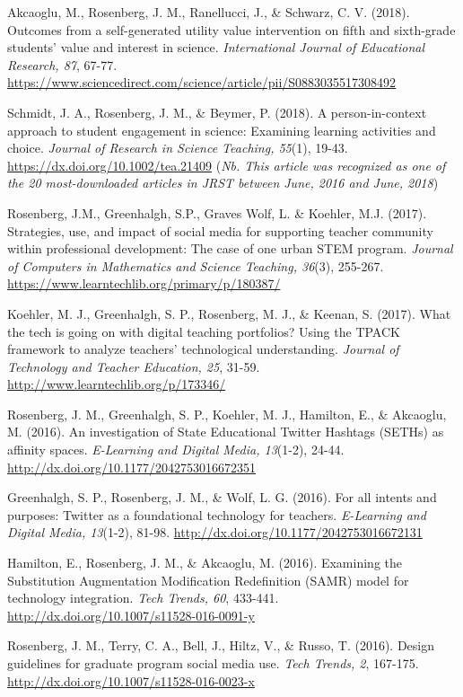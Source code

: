 \documentclass[14,]{article}
\begin{document}
Akcaoglu, M., Rosenberg, J. M., Ranellucci, J., \& Schwarz, C. V.
(2018). Outcomes from a self-generated utility value intervention on
fifth and sixth-grade students' value and interest in science.
\emph{International Journal of Educational Research, 87}, 67-77.
\url{https://www.sciencedirect.com/science/article/pii/S0883035517308492}

Schmidt, J. A., Rosenberg, J. M., \& Beymer, P. (2018). A
person-in-context approach to student engagement in science: Examining
learning activities and choice. \emph{Journal of Research in Science
Teaching, 55}(1), 19-43. \url{https://dx.doi.org/10.1002/tea.21409}
(\emph{Nb. This article was recognized as one of the 20 most-downloaded
articles in JRST between June, 2016 and June, 2018})

Rosenberg, J.M., Greenhalgh, S.P., Graves Wolf, L. \& Koehler, M.J.
(2017). Strategies, use, and impact of social media for supporting
teacher community within professional development: The case of one urban
STEM program. \emph{Journal of Computers in Mathematics and Science
Teaching, 36}(3), 255-267.
\url{https://www.learntechlib.org/primary/p/180387/}

Koehler, M. J., Greenhalgh, S. P., Rosenberg, M. J., \& Keenan, S.
(2017). What the tech is going on with digital teaching portfolios?
Using the TPACK framework to analyze teachers' technological
understanding. \emph{Journal of Technology and Teacher Education, 25},
31-59. \url{http://www.learntechlib.org/p/173346/}

Rosenberg, J. M., Greenhalgh, S. P., Koehler, M. J., Hamilton, E., \&
Akcaoglu, M. (2016). An investigation of State Educational Twitter
Hashtags (SETHs) as affinity spaces. \emph{E-Learning and Digital Media,
13}(1-2), 24-44. \url{http://dx.doi.org/10.1177/2042753016672351}

Greenhalgh, S. P., Rosenberg, J. M., \& Wolf, L. G. (2016). For all
intents and purposes: Twitter as a foundational technology for teachers.
\emph{E-Learning and Digital Media, 13}(1-2), 81-98.
\url{http://dx.doi.org/10.1177/2042753016672131}

Hamilton, E., Rosenberg, J. M., \& Akcaoglu, M. (2016). Examining the
Substitution Augmentation Modification Redefinition (SAMR) model for
technology integration. \emph{Tech Trends, 60}, 433-441.
\url{http://dx.doi.org/10.1007/s11528-016-0091-y}

Rosenberg, J. M., Terry, C. A., Bell, J., Hiltz, V., \& Russo, T.
(2016). Design guidelines for graduate program social media use.
\emph{Tech Trends, 2}, 167-175.
\url{http://dx.doi.org/10.1007/s11528-016-0023-x}
\end{document}
